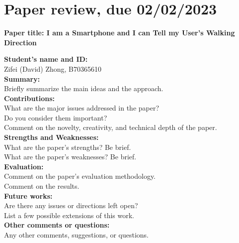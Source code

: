 \documentclass[11pt, oneside]{article}   	%
\begin{document}
\doublespacing

\section{Paper review, due 02/02/2023}
\begin{center}
\noindent
\textbf{\Large Paper title: I am a Smartphone and I can Tell my User's Walking Direction}
\end{center}


\noindent \textbf{Student's name and ID: }\\
Zifei (David) Zhong, B70365610\\

\noindent \textbf{Summary:}\\
Briefly summarize the main ideas and the approach.\\

\noindent \textbf{Contributions:}\\
What are the major issues addressed in the paper?\\
Do you consider them important?\\
Comment on the novelty, creativity, and technical depth of the paper.\\

\noindent \textbf{Strengths and Weaknesses:}\\
What are the paper’s strengths? Be brief.\\
What are the paper's weaknesses? Be brief.\\

\noindent \textbf{Evaluation:}\\
Comment on the paper's evaluation methodology.\\
Comment on the results.\\

\noindent \textbf{Future works:}\\
Are there any issues or directions left open?\\
List a few possible extensions of this work.\\

\noindent \textbf{Other comments or questions:}\\
Any other comments, suggestions, or questions.\\
\end{document}
